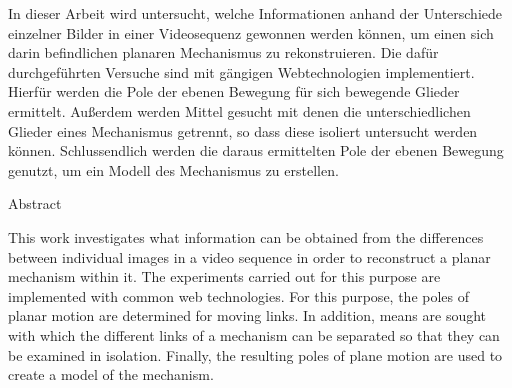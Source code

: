 %
\label{sec:abstract}

In dieser Arbeit wird untersucht, welche Informationen anhand der Unterschiede einzelner Bilder in einer Videosequenz gewonnen werden können, um einen sich darin befindlichen planaren Mechanismus zu rekonstruieren.
Die dafür durchgeführten Versuche sind mit gängigen Webtechnologien implementiert.
Hierfür werden die Pole der ebenen Bewegung für sich bewegende Glieder ermittelt.
Au{\ss}erdem werden Mittel gesucht mit denen die unterschiedlichen Glieder eines Mechanismus getrennt, so dass diese isoliert untersucht werden können.
Schlussendlich werden die daraus ermittelten Pole der ebenen Bewegung genutzt, um ein Modell des Mechanismus zu erstellen.

\vspace*{20mm}

{Abstract}
\label{sec:abstract-diff}

This work investigates what information can be obtained from the differences between individual images in a video sequence in order to reconstruct a planar mechanism within it.
The experiments carried out for this purpose are implemented with common web technologies.
For this purpose, the poles of planar motion are determined for moving links.
In addition, means are sought with which the different links of a mechanism can be separated so that they can be examined in isolation.
Finally, the resulting poles of plane motion are used to create a model of the mechanism.

